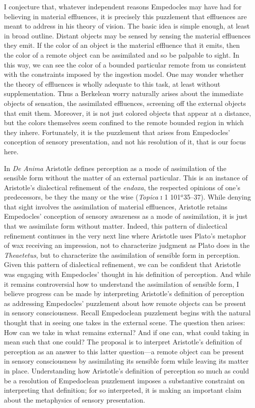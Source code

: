 \documentclass[12pt]{article}
\begin{document}
I conjecture that, whatever independent reasons Empedocles may have had for believing in material effluences, it is precisely this puzzlement that effluences are meant to address in his theory of vision. The basic idea is simple enough, at least in broad outline. Distant objects may be sensed by sensing the material effluences they emit. If the color of an object is the material effluence that it emits, then the color of a remote object can be assimilated and so be palpable to sight. In this way, we can see the color of a bounded particular remote from us  consistent with the constraints imposed by the ingestion model. One may wonder whether the theory of effluences is wholly adequate to this task, at least without supplementation. Thus a Berkelean worry naturally arises about the immediate objects of sensation, the assimilated effluences, screening off the external objects that emit them. Moreover, it is not just colored objects that appear at a distance, but the colors themselves seem confined to the remote bounded region in which they inhere. Fortunately, it is the puzzlement that arises from Empedocles' conception of sensory presentation, and not his resolution of it, that is our focus here. 

In \emph{De Anima} Aristotle defines perception as a mode of assimilation of the sensible form without the matter of an external particular. This is an instance of Aristotle's dialectical refinement of the \emph{endoxa}, the respected opinions of one's predecessors, be they the many or the wise (\emph{Topica} \textsc{i} 1 101\( ^{a} \)35--37). While denying that sight involves the assimilation of material effluences, Aristotle retains Empedocles' conception of sensory awareness as a mode of assimilation, it is just that we assimilate form without matter. Indeed, this pattern of dialectical refinement continues in the very next line where Aristotle uses Plato's metaphor of wax receiving an impression, not to characterize judgment as Plato does in the \emph{Theaetetus}, but to characterize the assimilation of sensible form in perception. Given this pattern of dialectical refinement, we can be confident that Aristotle was engaging with Empedocles' thought in his definition of perception. And while it remains controversial how to understand the assimilation of sensible form, I believe progress can be made by interpreting Aristotle's definition of perception as addressing Empedocles' puzzlement about how remote objects can be present in sensory consciousness. Recall Empedoclean puzzlement begins with the natural thought that in seeing one takes in the external scene. The question then arises: How can we take in what remains external? And if one can, what could taking in mean such that one could? The proposal is to interpret Aristotle's definition of perception as an answer to this latter question---a remote object can be present in sensory consciousness by assimilating its sensible form while leaving its matter in place. Understanding how Aristotle's definition of perception so much as could be a resolution of Empedoclean puzzlement imposes a substantive constraint on interpreting that definition; for so interpreted, it is making an important claim about the metaphysics of sensory presentation.
\end{document}
